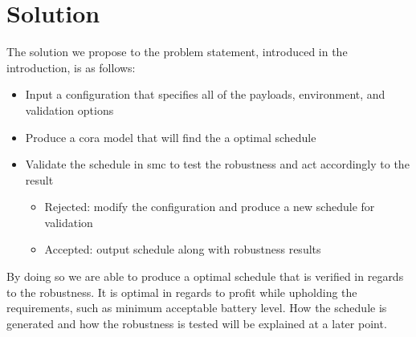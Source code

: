 \section{Solution} \label{sec:solution}
The solution we propose to the problem statement, introduced in the introduction, is as follows:
\begin{itemize}
	\item	Input a configuration that specifies all of the payloads, environment, and validation options
	\item	Produce a \gls{cora} model that will find the a optimal schedule
	\item	Validate the schedule in \gls{smc} to test the robustness and act accordingly to the result
	\begin{itemize}
		\item	Rejected: modify the configuration and produce a new schedule for validation
		\item	Accepted: output schedule along with robustness results
	\end{itemize}
\end{itemize}

By doing so we are able to produce a optimal schedule that is verified in regards to the robustness.
It is optimal in regards to profit while upholding the requirements, such as minimum acceptable battery level.
How the schedule is generated and how the robustness is tested will be explained at a later point.
